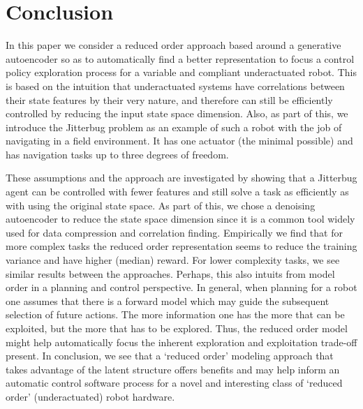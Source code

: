 \documentclass[letterpaper, 10 pt, conference]{ieeeconf}
\begin{document}


\section{Conclusion}

In this paper we consider a reduced order approach based around a generative autoencoder so as to automatically find a better representation to focus a control policy exploration process for a variable and compliant underactuated robot.  This is based on the intuition that underactuated systems have correlations between their state features by their very nature, and therefore can still be efficiently controlled by reducing the input state space dimension.   Also, as part of this, we introduce the Jitterbug problem as an example of such a robot with the job of navigating in a field environment.  It has one actuator (the minimal possible) and has navigation tasks up to three degrees of freedom.

These assumptions and the approach are investigated by showing that a Jitterbug agent can be controlled with fewer features and still solve a task as efficiently as with using the original state space.  As part of this, we chose a denoising autoencoder to reduce the state space dimension since it is a common tool widely used for data compression and correlation finding.  Empirically we find that for more complex tasks the reduced order representation seems to reduce the training  variance and have higher (median) reward.   For lower complexity tasks, we see similar results between the approaches.  Perhaps, this also intuits from model order in a planning and control perspective.  In general, when planning for a robot one assumes that there is a forward model which may guide the subsequent selection of future actions.   The more information one has the more that can be exploited, but the more that has to be explored.  Thus, the reduced order model might help automatically focus the inherent exploration and exploitation trade-off present.       In conclusion, we see that a `reduced order' modeling approach that takes advantage of the latent structure offers benefits and may help inform an automatic control software process for a novel and interesting class of `reduced order' (underactuated) robot hardware.
\end{document}
